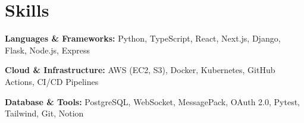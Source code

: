 \section{Skills}

\begin{onecolentry}
    \textbf{Languages \& Frameworks:} Python, TypeScript, React, Next.js, Django, Flask, Node.js, Express
\end{onecolentry}

\vspace{0.2cm}

\begin{onecolentry}
    \textbf{Cloud \& Infrastructure:} AWS (EC2, S3), Docker, Kubernetes, GitHub Actions, CI/CD Pipelines
\end{onecolentry}

\vspace{0.2cm}

\begin{onecolentry}
    \textbf{Database \& Tools:} PostgreSQL, WebSocket, MessagePack, OAuth 2.0, Pytest, Tailwind, Git, Notion
\end{onecolentry}

